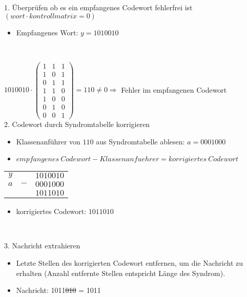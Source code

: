 1. Überprüfen ob es ein empfangenes Codewort fehlerfrei ist$(wort \cdot kontrollmatrix = 0)$

\begin{itemize}
\item Empfangenes Wort: $y = 1010010$
\end{itemize}\

$1010010 \cdot \begin{pmatrix}
1 & 1 & 1\\
1 & 0 & 1\\
0 & 1 & 1\\
1 & 1 & 0\\
1 & 0 & 0\\
0 & 1 & 0\\
0 & 0 & 1
\end{pmatrix} = 110 \not = 0 \Rightarrow$ Fehler im empfangenen Codewort\\

2. Codewort durch Syndromtabelle korrigieren

\begin{itemize}
\item Klassenanführer von $110$ aus Syndromtabelle ablesen: $a =0001000$
\item $empfangenes \ Codewort - Klassenanfuehrer = korrigiertes \ Codewort$
\end{itemize}

\begin{table}[h]
\centering
\begin{tabular}{ccc}
$y$ & & $1010010$\\
$a$ & $-$ & $0001000$\\
\hline
& & $1011010$
\end{tabular}
\end{table}

\begin{itemize}
\item korrigiertes Codewort: $1011010$
\end{itemize}\

3. Nachricht extrahieren

\begin{itemize}
\item Letzte Stellen des korrigierten Codewort entfernen, um die Nachricht zu erhalten (Anzahl entfernte Stellen entspricht Länge des Syndrom).
\item Nachricht: 1011\sout{010} = 1011
\end{itemize}